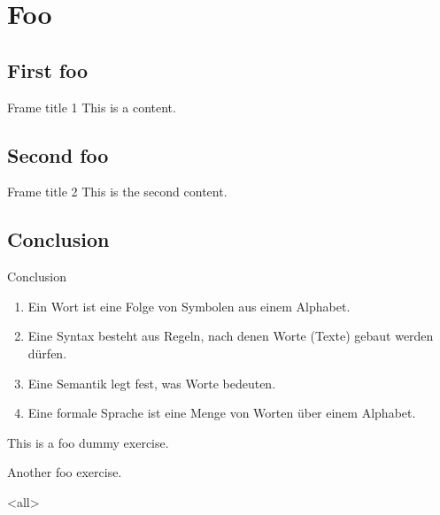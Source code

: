 
\chapter{Foo}


\section{First foo}

\begin{frame}{Frame title 1}
  This is a content.
\end{frame}

\section{Second foo}

\begin{frame}{Frame title 2}
  This is the second content.
\end{frame}

\section*{Conclusion}

\begin{frame}{Conclusion}
  \begin{enumerate}
    \item Ein \alert{Wort} ist eine Folge von Symbolen aus einem
      \alert{Alphabet}. 
    \item Eine \alert{Syntax} besteht aus Regeln, nach denen
      Worte (Texte) gebaut werden dürfen.
    \item Eine \alert{Semantik} legt fest, was Worte \alert{bedeuten}.
    \item Eine \alert{formale Sprache} ist eine Menge von Worten
      über einem Alphabet.
  \end{enumerate}
\end{frame}

\exercises

\begin{exercise}
  This is a foo dummy exercise.
\end{exercise}

\begin{exercise}
  Another foo exercise.
\end{exercise}

\mode
<all>